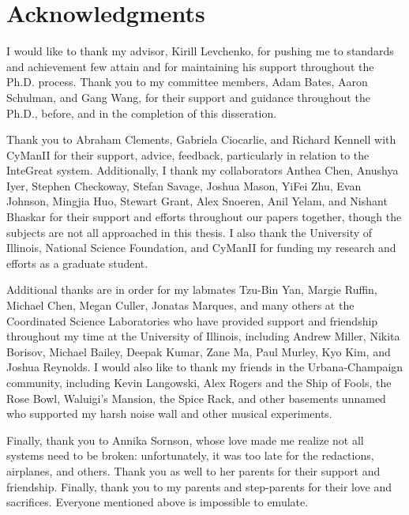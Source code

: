 \chapter*{Acknowledgments}

I would like to thank my advisor, Kirill Levchenko, for pushing me to standards and achievement few attain and for maintaining his support throughout the Ph.D. process.
Thank you to my committee members, Adam Bates, Aaron Schulman, and Gang Wang, for their support and guidance throughout the Ph.D., before, and in the completion of this disseration.

Thank you to Abraham Clements, Gabriela Ciocarlie, and Richard Kennell with CyManII for their support, advice, feedback, particularly in relation to the InteGreat system.
Additionally, I thank my collaborators Anthea Chen, Anushya Iyer, Stephen Checkoway, Stefan Savage, Joshua Mason, YiFei Zhu, Evan Johnson, Mingjia Huo, Stewart Grant, Alex Snoeren, Anil Yelam, and Nishant Bhaskar for their support and efforts throughout our papers together, though the subjects are not all approached in this thesis.
I also thank the University of Illinois, National Science Foundation, and CyManII for funding my research and efforts as a graduate student.

Additional thanks are in order for my labmates Tzu-Bin Yan, Margie Ruffin, Michael Chen, Megan Culler, Jonatas Marques, and many others at the Coordinated Science Laboratories who have provided support and friendship throughout my time at the University of Illinois, including Andrew Miller, Nikita Borisov, Michael Bailey, Deepak Kumar, Zane Ma, Paul Murley, Kyo Kim, and Joshua Reynolds.
I would also like to thank my friends in the Urbana-Champaign community, including Kevin Langowski, Alex Rogers and the Ship of Fools, the Rose Bowl, Waluigi's Mansion, the Spice Rack, and other basements unnamed who supported my harsh noise wall and other musical experiments.

Finally, thank you to Annika Sornson, whose love made me realize not all systems need to be broken: unfortunately, it was too late for the redactions, airplanes, and others.
Thank you as well to her parents for their support and friendship.
Finally, thank you to my parents and step-parents for their love and sacrifices.
Everyone mentioned above is impossible to emulate.
